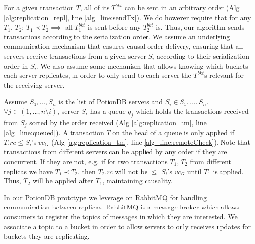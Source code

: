 \documentclass[sigconf, nonacm]{acmart}
\begin{document}
For a given transaction $T$, all of its $T^{bkt}$ can be sent in an arbitrary order (Alg \ref{alg:replication_repl}, line \ref{alg_line:sendTx}).
We do however require that for any $T_1$, $T_2$: $T_1 \prec T_2 \implies$ all $T_1^{bkt}$ is sent before any $T_2^{bkt}$ is.
Thus, our algorithm sends transactions according to the serialization order.
We assume an underlying communication mechanism that ensures causal order delivery, ensuring that all servers receive transactions from a given server $S_i$ according to their serialization order in $S_i$.
We also assume some mechanism that allows knowing which buckets each server replicates, in order to only send to each server the $T^{bkt}$s relevant for the receiving server.

Assume $S_1, ..., S_n$ is the list of PotionDB servers and $S_i \in S_1, ..., S_n$.
$\forall j \in (1, ..., n \setminus i)$, server $S_i$ has a queue $q_j$ which holds the transactions received from $S_j$ sorted by the order received (Alg \ref{alg:replication_tm}, line \ref{alg_line:queued}).
A transaction $T$ on the head of a queue is only applied if $T.rc \leq S_i$'s $vc_G$ (Alg \ref{alg:replication_tm}, line \ref{alg_line:remoteCheck}).
Note that transactions from different servers can be applied by any order if they are concurrent. 
If they are not, e.g. if for two transactions $T_1$, $T_2$ from different replicas we have $T_1 \prec T_2$, then $T_2.rc$ will not be $\leq$ $S_i$'s $vc_G$ until $T_1$ is applied.
Thus, $T_2$ will be applied after $T_1$, maintaining causality. %

In our PotionDB prototype we leverage on RabbitMQ \cite{rabbitmq} for handling communication between replicas.
RabbitMQ is a message broker which allows consumers to register the topics of messages in which they are interested.
We associate a topic to a bucket in order to allow servers to only receives updates for buckets they are replicating.
\end{document}
